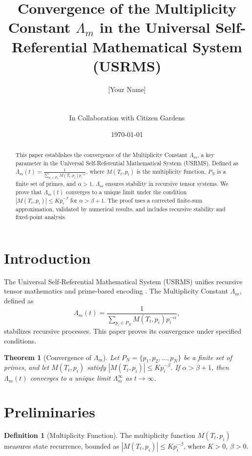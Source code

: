 \documentclass[11pt]{article}
\title{Convergence of the Multiplicity Constant \( \Lambda_m \) in the Universal Self-Referential Mathematical System (USRMS)}
\author{[Your Name] \\ [Your Affiliation] \\ [Your Email] \\ In Collaboration with Citizen Gardens}
\date{\today}
\newtheorem{theorem}{Theorem}
\theoremstyle{definition}
\newtheorem{definition}{Definition}
\theoremstyle{remark}
\begin{document}
\maketitle

\begin{abstract}
This paper establishes the convergence of the Multiplicity Constant \( \Lambda_m \), a key parameter in the Universal Self-Referential Mathematical System (USRMS). Defined as \( \Lambda_m(t) = \frac{1}{\sum_{p_i \in P_N} M(T_t, p_i) p_i^{-\alpha}} \), where \( M(T_t, p_i) \) is the multiplicity function, \( P_N \) is a finite set of primes, and \( \alpha > 1 \), \( \Lambda_m \) ensures stability in recursive tensor systems. We prove that \( \Lambda_m(t) \) converges to a unique limit under the condition \( |M(T_t, p_i)| \leq K p_i^{-\beta} \) for \( \alpha > \beta + 1 \). The proof uses a corrected finite-sum approximation, validated by numerical results, and includes recursive stability and fixed-point analysis.
\end{abstract}

\section{Introduction}
The Universal Self-Referential Mathematical System (USRMS) unifies recursive tensor mathematics and prime-based encoding \cite{USRMS2023}. The Multiplicity Constant \( \Lambda_m \), defined as
\[
\Lambda_m(t) = \frac{1}{\sum_{p_i \in P_N} M(T_t, p_i) p_i^{-\alpha}},
\]
stabilizes recursive processes. This paper proves its convergence under specified conditions.

\begin{theorem}[Convergence of \( \Lambda_m \)]
\label{thm:convergence}
Let \( P_N = \{ p_1, p_2, \dots, p_N \} \) be a finite set of primes, and let \( M(T_t, p_i) \) satisfy \( |M(T_t, p_i)| \leq K p_i^{-\beta} \). If \( \alpha > \beta + 1 \), then \( \Lambda_m(t) \) converges to a unique limit \( \Lambda_m^{\infty} \) as \( t \to \infty \).
\end{theorem}

\section{Preliminaries}

\begin{definition}[Multiplicity Function]
\label{def:multiplicity}
The multiplicity function \( M(T_t, p_i) \) measures state recurrence, bounded as \( |M(T_t, p_i)| \leq K p_i^{-\beta} \), where \( K > 0 \), \( \beta > 0 \).
\end{definition}
\end{document}
